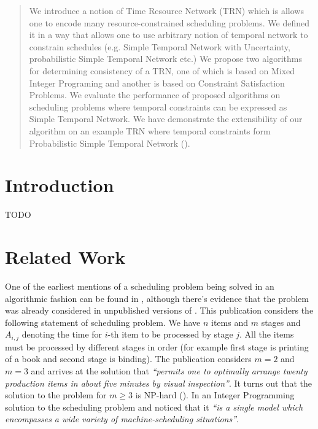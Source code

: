 \documentclass{article}
\begin{document}
\begin{multicols}{2}
\begin{abstract}
\noindent We introduce a notion of Time Resource Network (TRN) which is allows one to encode many resource-constrained scheduling problems. We defined it in a way that allows one to use arbitrary notion of temporal network to constrain schedules (e.g. Simple Temporal Network with Uncertainty, probabilistic Simple Temporal Network etc.) We propose two algorithms for determining consistency of a TRN, one of which is based on Mixed Integer Programing and another is based on Constraint Satisfaction Problems. We evaluate the performance of proposed algorithms on scheduling problems where temporal constraints can be expressed as Simple Temporal Network. We have demonstrate the extensibility of our algorithm on an example TRN where temporal constraints form Probabilistic Simple Temporal Network (\cite{Fang2014}).
\end{abstract}
\section{Introduction}
TODO
\section{Related Work}

One of the earliest mentions of a scheduling problem being solved in an algorithmic fashion can be found in \cite{johnson1954optimal}, although there's evidence that the problem was already considered in unpublished versions of \cite{bellman1956mathematical}. This publication considers the following statement of scheduling problem. We have $n$ items and $m$ stages and $A_{i,j}$ denoting the time for $i$-th item to be processed by stage $j$. All the items must be processed by different stages in order (for example first stage is printing of a book and second stage is binding). The publication considers $m=2$ and $m=3$ and arrives at the solution that \textit{``permits one to optimally arrange twenty production items in about five minutes by visual inspection''}. It turns out that the solution to the problem for $m \geq 3$ is NP-hard (\cite{garey1976complexity}). In \cite{wagner1959integer} an Integer Programming solution to the scheduling problem and noticed that it \textit{``is a single model which encompasses a wide variety of machine-scheduling situations''}.


\end{multicols}
\end{document}
